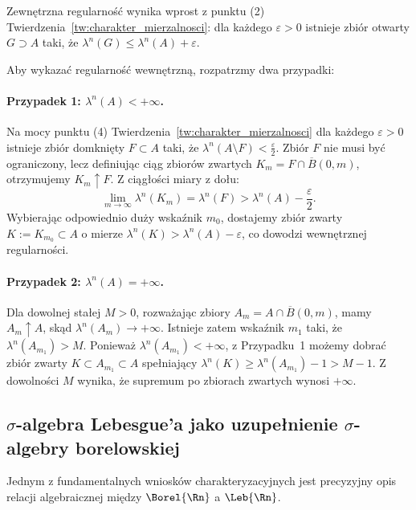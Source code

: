 \begin{dow}
    Zewnętrzna regularność wynika wprost z punktu (2) Twierdzenia~\ref{tw:charakter_mierzalnosci}: dla każdego $\varepsilon > 0$ istnieje zbiór otwarty $G \supset A$ taki, że $\lambda^n(G) \le \lambda^n(A) + \varepsilon$.

    Aby wykazać regularność wewnętrzną, rozpatrzmy dwa przypadki:
    \paragraph{Przypadek 1: $\lambda^n(A) < +\infty$.}
    Na mocy punktu (4) Twierdzenia~\ref{tw:charakter_mierzalnosci} dla każdego $\varepsilon > 0$ istnieje zbiór domknięty $F \subset A$ taki, że $\lambda^n(A \setminus F) < \frac{\varepsilon}{2}$. Zbiór $F$ nie musi być ograniczony, lecz definiując ciąg zbiorów zwartych $K_m = F \cap \overline{B}(0, m)$, otrzymujemy $K_m \uparrow F$. Z ciągłości miary z dołu:
    \begin{equation*}
        \lim_{m \to \infty} \lambda^n(K_m) = \lambda^n(F) > \lambda^n(A) - \frac{\varepsilon}{2}.
    \end{equation*}
    Wybierając odpowiednio duży wskaźnik $m_0$, dostajemy zbiór zwarty $K := K_{m_0} \subset A$ o mierze $\lambda^n(K) > \lambda^n(A) - \varepsilon$, co dowodzi wewnętrznej regularności.

    \paragraph{Przypadek 2: $\lambda^n(A) = +\infty$.}
    Dla dowolnej stałej $M > 0$, rozważając zbiory $A_m = A \cap \overline{B}(0, m)$, mamy $A_m \uparrow A$, skąd $\lambda^n(A_m) \to +\infty$. Istnieje zatem wskaźnik $m_1$ taki, że $\lambda^n(A_{m_1}) > M$. Ponieważ $\lambda^n(A_{m_1}) < +\infty$, z Przypadku~1 możemy dobrać zbiór zwarty $K \subset A_{m_1} \subset A$ spełniający $\lambda^n(K) \ge \lambda^n(A_{m_1}) - 1 > M - 1$. Z dowolności $M$ wynika, że supremum po zbiorach zwartych wynosi $+\infty$.
\end{dow}

\subsection{$\sigma$-algebra Lebesgue'a jako uzupełnienie $\sigma$-algebry borelowskiej}\label{sec:struktura_uzupelnienia}

Jednym z fundamentalnych wniosków charakteryzacyjnych jest precyzyjny opis relacji algebraicznej między $\Borel{\Rn}$ a $\Leb{\Rn}$.

